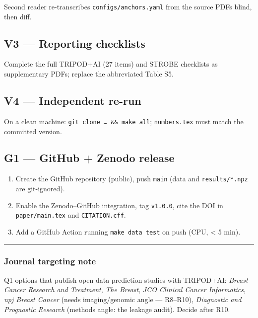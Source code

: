 \documentclass[
  10pt,
]{article}
\providecommand{\tightlist}{%
  \setlength{\itemsep}{0pt}\setlength{\parskip}{0pt}}
\begin{document}
Second reader re-transcribes \texttt{configs/anchors.yaml} from the
source PDFs blind, then diff.

\hypertarget{v3-reporting-checklists}{%
\subsection{V3 --- Reporting checklists}\label{v3-reporting-checklists}}

Complete the full TRIPOD+AI (27 items) and STROBE checklists as
supplementary PDFs; replace the abbreviated Table S5.

\hypertarget{v4-independent-re-run}{%
\subsection{V4 --- Independent re-run}\label{v4-independent-re-run}}

On a clean machine: \texttt{git\ clone\ …\ \&\&\ make\ all};
\texttt{numbers.tex} must match the committed version.

\hypertarget{g1-github-zenodo-release}{%
\subsection{G1 --- GitHub + Zenodo
release}\label{g1-github-zenodo-release}}

\begin{enumerate}
\def\labelenumi{\arabic{enumi}.}
\tightlist
\item
  Create the GitHub repository (public), push \texttt{main} (data and
  \texttt{results/*.npz} are git-ignored).
\item
  Enable the Zenodo--GitHub integration, tag \texttt{v1.0.0}, cite the
  DOI in \texttt{paper/main.tex} and \texttt{CITATION.cff}.
\item
  Add a GitHub Action running \texttt{make\ data\ test} on push (CPU,
  \textless{} 5 min).
\end{enumerate}

\begin{center}\rule{0.5\linewidth}{0.5pt}\end{center}

\hypertarget{journal-targeting-note}{%
\subsubsection{Journal targeting note}\label{journal-targeting-note}}

Q1 options that publish open-data prediction studies with TRIPOD+AI:
\emph{Breast Cancer Research and Treatment}, \emph{The Breast},
\emph{JCO Clinical Cancer Informatics}, \emph{npj Breast Cancer} (needs
imaging/genomic angle --- R8--R10), \emph{Diagnostic and Prognostic
Research} (methods angle: the leakage audit). Decide after R10.
\end{document}
